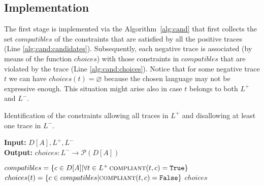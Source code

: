 
\subsection{Implementation}


The first stage is implemented via the Algorithm~\ref{alg:cand} that first collects the set $compatibles$ of the constraints that are satisfied by all the positive traces (Line \ref{alg:cand:candidates}). Subsequently, each negative trace is associated (by means of the function ${choices}$) with those constraints in $compatibles$ that are violated by the trace (Line \ref{alg:cand:choices}). Notice that for some negative trace $t$ we can have $choices(t)=\varnothing$ because the chosen language may not be expressive enough. This situation might arise also in case $t$ belongs to both $L^+$ and $L^-$.
%
\begin{algorithm}
    \caption{Identification of the constraints allowing all traces in $L^+$ and disallowing at least one trace in $L^-$.}
    \label{alg:cand}
    \textbf{Input:}  $D[A], L^+, L^-$\\
    \textbf{Output:} ${choices} : L^- \rightarrow \mathcal{P}({D[A]})$
	\begin{algorithmic}[1] 
   	\State ${compatibles}= \{c \in D[A] | \forall t \in L^+\, \Call{compliant}{t,c} = \texttt{True}\}$ \label{alg:cand:candidates}
		\State ${choices}(t) = \{c \in {compatibles} | \Call{compliant}{t,c} = \texttt{False}\}$\label{alg:cand:choices}
	\EndFor
	\State \Return ${choices}$
    \EndProcedure
    \end{algorithmic}
\end{algorithm}

